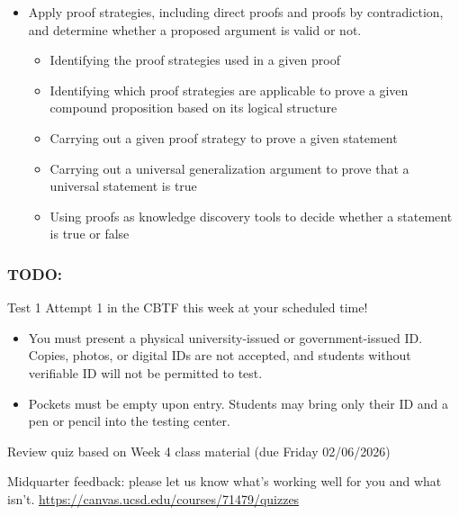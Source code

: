 \documentclass[12pt, oneside]{article}
\begin{document}
\begin{itemize}
\item Apply proof strategies, including direct proofs and proofs by contradiction, and determine whether a proposed argument is valid or not.
\begin{itemize}
    \item Identifying the proof strategies used in a given proof
    \item Identifying which proof strategies are applicable to prove a given compound proposition based on its logical structure
    \item Carrying out a given proof strategy to prove a given statement
    \item Carrying out a universal generalization argument to prove that a universal statement is true
    \item Using proofs as knowledge discovery tools to decide whether a statement is true or false
\end{itemize}
\end{itemize}

\subsubsection*{TODO:}
\begin{list}
   {\itemsep2pt}
    \item Test 1 Attempt 1 in the CBTF this week at your scheduled time!
    \begin{itemize}
    \item You must present a physical university-issued or government-issued ID. Copies, photos, or digital IDs are not accepted, and students without verifiable ID will not be permitted to test. 
    \item Pockets must be empty upon entry. Students may bring only their ID and a pen or pencil into the testing center. 
    \end{itemize}

    \item Review quiz based on Week 4 class material (due Friday 02/06/2026)
    \item Midquarter feedback: please let us know what's working well for you and what isn't.  \url{https://canvas.ucsd.edu/courses/71479/quizzes}
\end{list}
\newpage
\end{document}
